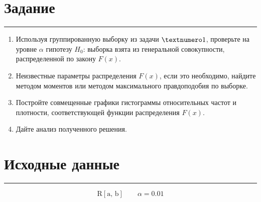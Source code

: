 \documentclass[a4paper, 14pt]{extarticle}
\begin{document}
\lstset{style=mystyle, extendedchars=\true}


\section*{Задание}\vspace{-20pt}\rule{\linewidth}{0.1mm}

\begin{enumerate}
    \item Используя группированную выборку из задачи $\textnumero 1$, проверьте на уровне $\alpha$ гипотезу $H_0$: выборка взята из генеральной совокупности, распределенной по закону $F(x)$.
    \item Неизвестные параметры распределения $F(x)$, если это необходимо, найдите методом моментов или методом максимального правдоподобия по выборке.
    \item Постройте совмещенные графики гистограммы относительных частот и плотности, соответствующей функции распределения $F(x)$.
    \item Дайте анализ полученного решения.
\end{enumerate}

\vspace{30pt}

\section*{Исходные данные}\vspace{-20pt}\rule{\linewidth}{0.1mm}

\begin{equation*}
    \text{R}[\text{a, b}] \qquad \alpha = 0.01
\end{equation*}

\vspace{-20pt}
\end{document}
